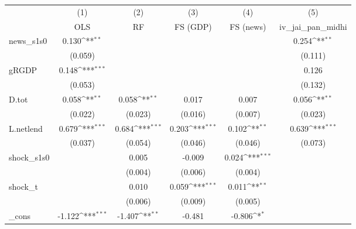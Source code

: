 {
\def\sym#1{\ifmmode^{#1}\else\(^{#1}\)\fi}
\begin{tabular}{l*{5}{c}}
\toprule
            &\multicolumn{1}{c}{(1)}&\multicolumn{1}{c}{(2)}&\multicolumn{1}{c}{(3)}&\multicolumn{1}{c}{(4)}&\multicolumn{1}{c}{(5)}\\
            &\multicolumn{1}{c}{OLS}&\multicolumn{1}{c}{RF}&\multicolumn{1}{c}{FS (GDP)}&\multicolumn{1}{c}{FS (news)}&\multicolumn{1}{c}{iv\_jai\_pan\_midhi}\\
\midrule
news\_s1s0   &       0.130\sym{**} &                     &                     &                     &       0.254\sym{**} \\
            &     (0.059)         &                     &                     &                     &     (0.111)         \\
\addlinespace
gRGDP       &       0.148\sym{***}&                     &                     &                     &       0.126         \\
            &     (0.053)         &                     &                     &                     &     (0.132)         \\
\addlinespace
D.tot       &       0.058\sym{**} &       0.058\sym{**} &       0.017         &       0.007         &       0.056\sym{**} \\
            &     (0.022)         &     (0.023)         &     (0.016)         &     (0.007)         &     (0.023)         \\
\addlinespace
L.netlend   &       0.679\sym{***}&       0.684\sym{***}&       0.203\sym{***}&       0.102\sym{**} &       0.639\sym{***}\\
            &     (0.037)         &     (0.054)         &     (0.046)         &     (0.046)         &     (0.073)         \\
\addlinespace
shock\_s1s0  &                     &       0.005         &      -0.009         &       0.024\sym{***}&                     \\
            &                     &     (0.004)         &     (0.006)         &     (0.004)         &                     \\
\addlinespace
shock\_t     &                     &       0.010         &       0.059\sym{***}&       0.011\sym{**} &                     \\
            &                     &     (0.006)         &     (0.009)         &     (0.005)         &                     \\
\addlinespace
\_cons      &      -1.122\sym{***}&      -1.407\sym{**} &      -0.481         &      -0.806\sym{*}  &                     \\

\end{tabular}}
